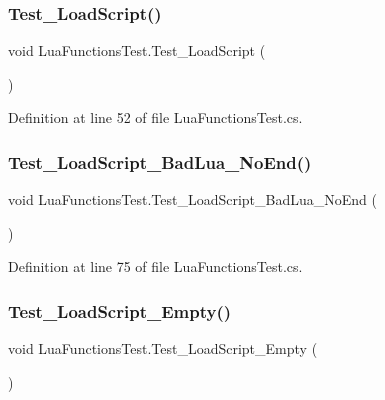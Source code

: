 \subsubsection{\texorpdfstring{Test\+\_\+\+Load\+Script()}{Test\_LoadScript()}}
{\footnotesize\ttfamily void Lua\+Functions\+Test.\+Test\+\_\+\+Load\+Script (\begin{DoxyParamCaption}{ }\end{DoxyParamCaption})}



Definition at line 52 of file Lua\+Functions\+Test.\+cs.

\mbox{\label{class_lua_functions_test_ab1f8d4772b9671a797d2c98db1c8ecdd}} 
\subsubsection{\texorpdfstring{Test\+\_\+\+Load\+Script\+\_\+\+Bad\+Lua\+\_\+\+No\+End()}{Test\_LoadScript\_BadLua\_NoEnd()}}
{\footnotesize\ttfamily void Lua\+Functions\+Test.\+Test\+\_\+\+Load\+Script\+\_\+\+Bad\+Lua\+\_\+\+No\+End (\begin{DoxyParamCaption}{ }\end{DoxyParamCaption})}



Definition at line 75 of file Lua\+Functions\+Test.\+cs.

\mbox{\label{class_lua_functions_test_ad715c476f6ee4279566d4a077deb4065}} 
\subsubsection{\texorpdfstring{Test\+\_\+\+Load\+Script\+\_\+\+Empty()}{Test\_LoadScript\_Empty()}}
{\footnotesize\ttfamily void Lua\+Functions\+Test.\+Test\+\_\+\+Load\+Script\+\_\+\+Empty (\begin{DoxyParamCaption}{ }\end{DoxyParamCaption})}



